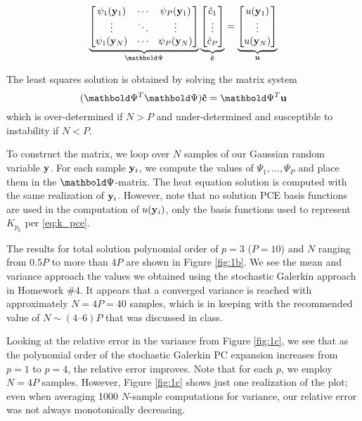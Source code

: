 \documentclass[11pt]{article}
\begin{document}
\begin{equation}
\underbrace{
\begin{bmatrix}
\psi_1(\mb{y}_1) & \cdots & \psi_P(\mb{y}_1) \\
\vdots & \ddots & \vdots \\
\psi_1(\mb{y}_N) & \cdots & \psi_P(\mb{y}_N)
\end{bmatrix}
}_{\mb{\Psi}}
\underbrace{
\begin{bmatrix}
\hat{c}_1 \\ \vdots \\ \hat{c}_P
\end{bmatrix}
}_{\mb{\hat{c}}}
=
\underbrace{
\begin{bmatrix}
u(\mb{y}_1) \\ \vdots \\ u(\mb{y}_N)
\end{bmatrix}
}_{\mb{u}}
\end{equation}

The least squares solution is obtained by solving the matrix system
\begin{equation}
( \mb{\Psi}^T \mb{\Psi} ) \mb{\hat{c}} = \mb{\Psi}^T \mb{u}
\end{equation}
which is over-determined if $N > P$ and under-determined and susceptible to instability if $N < P$.

To construct the matrix, we loop over $N$ samples of our Gaussian random variable $\mb{y}$. For each sample $\mb{y}_i$, we compute the values of $\Psi_1, \dots, \Psi_P$ and place them in the $\mb{\Psi}$-matrix. The heat equation solution is computed with the same realization of $\mb{y}_i$. However, note that no solution PCE basis functions are used in the computation of $u(\mb{y}_i)$, only the basis functions used to represent $K_{p_k}$ per \eqref{eq:k_pce}.

The results for total solution polynomial order of $p=3$ ($P=10$) and $N$ ranging from $0.5 P$ to more than $4 P$ are shown in Figure \ref{fig:1b}. We see the mean and variance approach the values we obtained using the stochastic Galerkin approach in Homework \#4. It appears that a converged variance is reached with approximately $N=4P=40$ samples, which is in keeping with the recommended value of $N\sim(4\text{--}6)P$ that was discussed in class.

Looking at the relative error in the variance from Figure \ref{fig:1c}, we see that as the polynomial order of the stochastic Galerkin PC expansion increases from $p=1$ to $p=4$, the relative error improves. Note that for each $p$, we employ $N=4P$ samples. However, Figure \ref{fig:1c} shows just one realization of the plot; even when averaging 1000 $N$-sample computations for variance, our relative error was not always monotonically decreasing.
\end{document}
